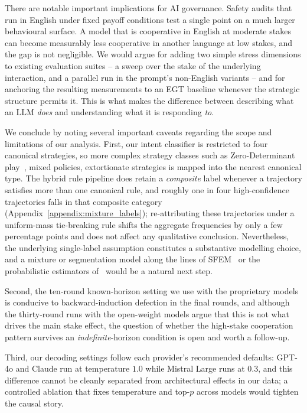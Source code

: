 \documentclass[a4paper,fleqn]{cas-sc}
\begin{document}
There are notable important implications for AI governance. Safety audits that run in English under fixed payoff conditions test a single point on a much larger behavioural surface. A model that is cooperative in English at moderate stakes can become measurably less cooperative in another language at low stakes, and the gap is not negligible. We would argue for adding two simple stress dimensions to existing evaluation suites -- a sweep over the stake of the underlying interaction, and a parallel run in the prompt's non-English variants -- and for anchoring the resulting measurements to an EGT baseline whenever the strategic structure permits it. This is what makes the difference between describing what an LLM \emph{does} and understanding what it is responding \emph{to}.

We conclude by noting several important caveats regarding the scope and limitations of our analysis. First, our intent classifier  is restricted to four canonical strategies, so  more complex strategy classes  such as Zero-Determinant play~\cite{pressDyson2012,hilbe2013memory}, mixed policies, extortionate strategies is mapped into the nearest canonical type. The hybrid rule pipeline does retain a \emph{composite} label whenever a trajectory satisfies more than one canonical rule, and roughly one in four high-confidence trajectories falls in that composite category (Appendix~\ref{appendix:mixture_labels}); re-attributing these trajectories under a uniform-mass tie-breaking rule shifts the aggregate frequencies by only a few percentage points and does not affect any qualitative conclusion. Nevertheless, the underlying single-label assumption constitutes a substantive modelling choice, and a mixture or segmentation model along the lines of SFEM~\cite{fontana2025nicer} or the probabilistic estimators of~\cite{inferenceStrategies} would be a natural next step. 

Second, the ten-round known-horizon setting we use with the proprietary models is conducive to backward-induction defection in the final rounds, and although the thirty-round runs with the open-weight models argue that this is not what drives the main stake effect, the question of whether the high-stake cooperation pattern survives an \emph{indefinite}-horizon condition is open and worth a follow-up. 

Third, our decoding settings follow each provider's recommended defaults: GPT-4o and Claude run at temperature $1.0$ while Mistral Large runs at $0.3$, and this difference cannot be cleanly separated from architectural effects in our data; a controlled ablation that fixes temperature and top-$p$ across models would tighten the causal story. 
\end{document}
